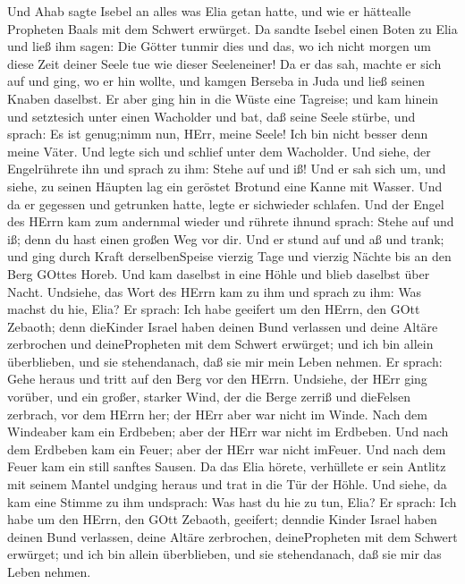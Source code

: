  Und Ahab sagte Isebel an alles was Elia getan hatte, und
wie er hättealle Propheten Baals mit dem Schwert erwürget. 
Da sandte Isebel einen Boten zu Elia und ließ ihm sagen: Die Götter
tunmir dies und das, wo ich nicht morgen um diese Zeit deiner Seele tue
wie dieser Seeleneiner!  Da er das sah, machte er sich auf
und ging, wo er hin wollte, und kamgen Berseba in Juda und ließ seinen
Knaben daselbst.  Er aber ging hin in die Wüste eine
Tagreise; und kam hinein und setztesich unter einen Wacholder und bat,
daß seine Seele stürbe, und sprach: Es ist genug;nimm nun, HErr, meine
Seele! Ich bin nicht besser denn meine Väter.  Und legte
sich und schlief unter dem Wacholder. Und siehe, der Engelrührete ihn
und sprach zu ihm: Stehe auf und iß!  Und er sah sich um,
und siehe, zu seinen Häupten lag ein geröstet Brotund eine Kanne mit
Wasser. Und da er gegessen und getrunken hatte, legte er sichwieder
schlafen.  Und der Engel des HErrn kam zum andernmal wieder
und rührete ihnund sprach: Stehe auf und iß; denn du hast einen großen
Weg vor dir.  Und er stund auf und aß und trank; und ging
durch Kraft derselbenSpeise vierzig Tage und vierzig Nächte bis an den
Berg GOttes Horeb.  Und kam daselbst in eine Höhle und blieb
daselbst über Nacht. Undsiehe, das Wort des HErrn kam zu ihm und sprach
zu ihm: Was machst du hie, Elia?  Er sprach: Ich habe
geeifert um den HErrn, den GOtt Zebaoth; denn dieKinder Israel haben
deinen Bund verlassen und deine Altäre zerbrochen und deinePropheten mit
dem Schwert erwürget; und ich bin allein überblieben, und sie
stehendanach, daß sie mir mein Leben nehmen.  Er sprach:
Gehe heraus und tritt auf den Berg vor den HErrn. Undsiehe, der HErr
ging vorüber, und ein großer, starker Wind, der die Berge zerriß und
dieFelsen zerbrach, vor dem HErrn her; der HErr aber war nicht im Winde.
Nach dem Windeaber kam ein Erdbeben; aber der HErr war nicht im
Erdbeben.  Und nach dem Erdbeben kam ein Feuer; aber der
HErr war nicht imFeuer. Und nach dem Feuer kam ein still sanftes Sausen.
 Da das Elia hörete, verhüllete er sein Antlitz mit seinem
Mantel undging heraus und trat in die Tür der Höhle. Und siehe, da kam
eine Stimme zu ihm undsprach: Was hast du hie zu tun, Elia?
 Er sprach: Ich habe um den HErrn, den GOtt Zebaoth,
geeifert; denndie Kinder Israel haben deinen Bund verlassen, deine
Altäre zerbrochen, deinePropheten mit dem Schwert erwürget; und ich bin
allein überblieben, und sie stehendanach, daß sie mir das Leben nehmen.
